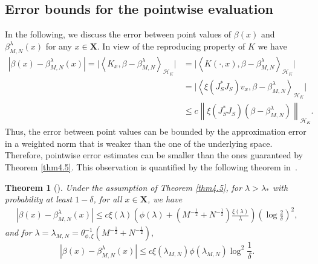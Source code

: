 \documentclass[USenglish]{article}
\newcommand{\norm}[1]{\left\lVert#1\right\rVert}
\newcommand{\innerpro}[1]{\left\langle#1\right\rangle}
\newcommand{\bX}{\mathbf{X}}
\newcommand{\lam}{\lambda}
\newcommand{\hk}{{\mathcal{H}_K}}
\newtheorem{theorem}{Theorem}[section]
\begin{document}
\subsection{Error bounds for the pointwise evaluation}
In the following, we discuss the error between point values of $\beta (x)$ and $\beta^\lam_{M,N} (x) $ for any $x \in \bX$. In view of the reproducing property of $K$ we have 
\begin{align*}
	|\beta (x) - \beta^\lam_{M,N} (x) | = \big|  \innerpro{K_{x},\beta - \beta^\lam_{M,N} }_\hk \big| 
	& = \big|  \innerpro{K(\cdot , x),\beta - \beta^\lam_{M,N} }_\hk \big|\nonumber\\
	&= \big| \innerpro{\xi(J^*_S J_S)v_x, \beta - \beta^\lam_{M,N}}_\hk \big| \nonumber\\
	&\leq c \norm{\xi (J^*_S J_S) (\beta - \beta^\lam_{M,N})  }_\hk. %
\end{align*}
Thus, the error between point values can be bounded by the approximation error in a weighted norm that is weaker than the one of the underlying space. Therefore, pointwise error estimates can be smaller than the ones guaranteed by Theorem \ref{thm4.5}. This observation is quantified by the following theorem in~\cite{nguyen2023regularized}.
\begin{theorem}[\cite{nguyen2023regularized}]
\label{thrm5.3}
		Under the assumption of Theorem \ref{thm4.5}, for $\lambda > \lam_*$ with probability at least $1 - \delta$, for all $x \in \bX$, we have 
			\begin{align*}
			|\beta (x) - \beta^\lam_{M,N} (x) |  \leq c \xi (\lam) \left( \phi(\lam) +  (M^{-\frac12} + N^{-\frac12}) \frac{\xi (\lam)}{\lam} \right) \left( \log \frac{2}{\delta}\right)^2,
		\end{align*}
	and for $\lam = \lambda_{M,N} = \theta_{\phi,\xi}^{-1} (M^{-\frac12} + N^{-\frac12}),$
	\[ |\beta (x) - \beta^\lam_{M,N} (x) |  \leq c \xi (\lambda_{M,N}) \phi(\lambda_{M,N}) \log^2 \frac{1}{\delta}.\]
\end{theorem}
\end{document}
